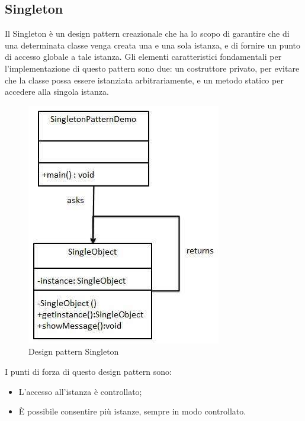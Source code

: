 \subsection{Singleton}
Il Singleton è un design pattern creazionale che ha lo scopo di garantire che di una determinata classe venga creata una e una sola istanza, e di fornire un punto di accesso globale a tale istanza.
Gli elementi caratteristici fondamentali per l'implementazione di questo pattern sono due: un costruttore privato, per evitare che la classe possa essere istanziata arbitrariamente, e un metodo statico per accedere alla singola istanza.
\begin{figure}[h]
	\centering
	\includegraphics[width=0.4\linewidth]{IMG/singleton_pattern}
	\caption{Design pattern Singleton}
\end{figure}

I punti di forza di questo design pattern sono:
\begin{itemize}
	\item L'accesso all'istanza è controllato;
	\item \MakeUppercase{è} possibile consentire più istanze, sempre in modo controllato.
\end{itemize}

